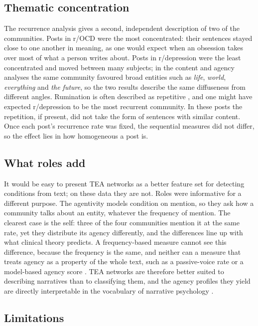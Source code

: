 \documentclass[11pt,a4paper]{article}
\begin{document}
\subsection{Thematic concentration}

The recurrence analysis gives a second, independent description of two of the communities. Posts in r/OCD were the most concentrated: their sentences stayed close to one another in meaning, as one would expect when an obsession takes over most of what a person writes about. Posts in r/depression were the least concentrated and moved between many subjects; in the content and agency analyses the same community favoured broad entities such as \textit{life}, \textit{world}, \textit{everything} and \textit{the future}, so the two results describe the same diffuseness from different angles. Rumination is often described as repetitive \citep{nolenhoeksema2000}, and one might have expected r/depression to be the most recurrent community. In these posts the repetition, if present, did not take the form of sentences with similar content. Once each post's recurrence rate was fixed, the sequential measures did not differ, so the effect lies in how homogeneous a post is.

\subsection{What roles add}

It would be easy to present TEA networks as a better feature set for detecting conditions from text; on these data they are not. Roles were informative for a different purpose. The agentivity models condition on mention, so they ask how a community talks about an entity, whatever the frequency of mention. The clearest case is the self: three of the four communities mention it at the same rate, yet they distribute its agency differently, and the differences line up with what clinical theory predicts. A frequency-based measure cannot see this difference, because the frequency is the same, and neither can a measure that treats agency as a property of the whole text, such as a passive-voice rate \citep{simchon2023} or a model-based agency score \citep{witkowska2026}. TEA networks are therefore better suited to describing narratives than to classifying them, and the agency profiles they yield are directly interpretable in the vocabulary of narrative psychology \citep{mcadams1996,adler2012}.

\subsection{Limitations}
\end{document}
